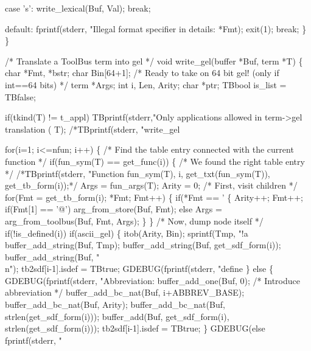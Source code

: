     case 's':
      write_lexical(Buf, Val);
      break;
      
    default:
      fprintf(stderr, "Illegal format specifier in details: %
              *Fmt);
      exit(1);
      break;
    \}
\}


/* Translate a ToolBus term into gel */
void write_gel(buffer *Buf, term *T)
\{
  char *Fmt, *bstr;
  char Bin[64+1]; /* Ready to take on 64 bit gel! (only if int==64 bits) */
  term *Args;
  int i, Len, Arity;
  char *ptr;
  TBbool is_list = TBfalse;

  if(tkind(T) != t_appl)
    TBprintf(stderr,"Only applications allowed in term->gel translation (%
            T);
  /*TBprintf(stderr, "write_gel %

  for(i=1; i<=nfun; i++)
    \{
      /* Find the table entry connected with the current function */
      if(fun_sym(T) == get_func(i))
      \{
        /* We found the right table entry */
        /*TBprintf(stderr, "Function %
                 fun_sym(T), i, get_txt(fun_sym(T)), get_tb_form(i));*/
        Args = fun_args(T);
        Arity = 0;
        /* First, visit children */
        for(Fmt = get_tb_form(i); *Fmt; Fmt++)
          \{
            if(*Fmt == '%
              \{
                Arity++;
                Fmt++;
                if(Fmt[1] == '@')
                  arg_from_store(Buf, Fmt);
                else
                  Args = arg_from_toolbus(Buf, Fmt, Args);
              \}
          \}
        /* Now, dump node itself */
        if(!is_defined(i))
          if(ascii_gel)
            \{
              itob(Arity, Bin);
              sprintf(Tmp, "!a%
              buffer_add_string(Buf, Tmp);
              buffer_add_string(Buf, get_sdf_form(i));
              buffer_add_string(Buf, "\\n");
              tb2sdf[i-1].isdef = TBtrue;
              GDEBUG(fprintf(stderr, "define %
            \}
          else
            \{
              GDEBUG(fprintf(stderr, "Abbreviation: %
              buffer_add_one(Buf, 0);  /* Introduce abbreviation */
              buffer_add_bc_nat(Buf, i+ABBREV_BASE);
              buffer_add_bc_nat(Buf, Arity);
              buffer_add_bc_nat(Buf, strlen(get_sdf_form(i)));
              buffer_add(Buf, get_sdf_form(i), strlen(get_sdf_form(i)));
              tb2sdf[i-1].isdef = TBtrue;
            \}
        GDEBUG(else
          fprintf(stderr, "%
        
